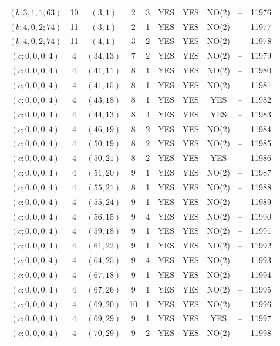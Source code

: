 \begin{longtable}{|c|c|c|c|c|c|c|c|c|c|}
$(b; 3, 1, 1; 63)$ & 10 & $(3, 1)$ & 2 & 3 & YES & YES & NO(2) & -- & 11976\\
$(b; 4, 0, 2; 74)$ & 11 & $(3, 1)$ & 2 & 1 & YES & YES & NO(2) & -- & 11977\\
$(b; 4, 0, 2; 74)$ & 11 & $(4, 1)$ & 3 & 2 & YES & YES & NO(2) & -- & 11978\\
$(c; 0, 0, 0; 4)$ & 4 & $(34, 13)$ & 7 & 2 & YES & YES & NO(2) & -- & 11979\\
$(c; 0, 0, 0; 4)$ & 4 & $(41, 11)$ & 8 & 1 & YES & YES & NO(2) & -- & 11980\\
$(c; 0, 0, 0; 4)$ & 4 & $(41, 15)$ & 8 & 1 & YES & YES & NO(2) & -- & 11981\\
$(c; 0, 0, 0; 4)$ & 4 & $(43, 18)$ & 8 & 1 & YES & YES & YES & -- & 11982\\
$(c; 0, 0, 0; 4)$ & 4 & $(44, 13)$ & 8 & 4 & YES & YES & YES & -- & 11983\\
$(c; 0, 0, 0; 4)$ & 4 & $(46, 19)$ & 8 & 2 & YES & YES & NO(2) & -- & 11984\\
$(c; 0, 0, 0; 4)$ & 4 & $(50, 19)$ & 8 & 2 & YES & YES & NO(2) & -- & 11985\\
$(c; 0, 0, 0; 4)$ & 4 & $(50, 21)$ & 8 & 2 & YES & YES & YES & -- & 11986\\
$(c; 0, 0, 0; 4)$ & 4 & $(51, 20)$ & 9 & 1 & YES & YES & NO(2) & -- & 11987\\
$(c; 0, 0, 0; 4)$ & 4 & $(55, 21)$ & 8 & 1 & YES & YES & NO(2) & -- & 11988\\
$(c; 0, 0, 0; 4)$ & 4 & $(55, 24)$ & 9 & 1 & YES & YES & NO(2) & -- & 11989\\
$(c; 0, 0, 0; 4)$ & 4 & $(56, 15)$ & 9 & 4 & YES & YES & NO(2) & -- & 11990\\
$(c; 0, 0, 0; 4)$ & 4 & $(59, 18)$ & 9 & 1 & YES & YES & NO(2) & -- & 11991\\
$(c; 0, 0, 0; 4)$ & 4 & $(61, 22)$ & 9 & 1 & YES & YES & NO(2) & -- & 11992\\
$(c; 0, 0, 0; 4)$ & 4 & $(64, 25)$ & 9 & 4 & YES & YES & NO(2) & -- & 11993\\
$(c; 0, 0, 0; 4)$ & 4 & $(67, 18)$ & 9 & 1 & YES & YES & NO(2) & -- & 11994\\
$(c; 0, 0, 0; 4)$ & 4 & $(67, 26)$ & 9 & 1 & YES & YES & NO(2) & -- & 11995\\
$(c; 0, 0, 0; 4)$ & 4 & $(69, 20)$ & 10 & 1 & YES & YES & NO(2) & -- & 11996\\
$(c; 0, 0, 0; 4)$ & 4 & $(69, 29)$ & 9 & 1 & YES & YES & YES & -- & 11997\\
$(c; 0, 0, 0; 4)$ & 4 & $(70, 29)$ & 9 & 2 & YES & YES & NO(2) & -- & 11998\\

\end{longtable}
